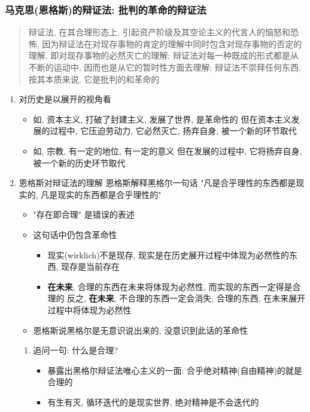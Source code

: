 \documentclass[11pt]{article}
\begin{document}
\subsubsection{马克思(恩格斯)的辩证法: 批判的革命的辩证法}
\label{sec:org94c8fba}
\begin{quote}
辩证法, 在其合理形态上, 引起资产阶级及其空论主义的代言人的恼怒和恐怖, 
因为辩证法在对现存事物的肯定的理解中同时包含对现存事物的否定的理解, 即对现存事物的必然灭亡的理解;
辩证法对每一种既成的形式都是从不断的运动中, 因而也是从它的暂时性方面去理解;
辩证法不崇拜任何东西, 按其本质来说, 它是批判的和革命的
\end{quote}
\begin{enumerate}
\item 对历史是以展开的视角看
\label{sec:orgbf6d819}
\begin{itemize}
\item 如, 资本主义, 打破了封建主义, 发展了世界, 是革命性的
但在资本主义发展的过程中, 它压迫劳动力, 它必然灭亡, 扬弃自身, 被一个新的环节取代
\item 如, 宗教, 有一定的地位, 有一定的意义
但在发展的过程中, 它将扬弃自身, 被一个新的历史环节取代
\end{itemize}
\item 恩格斯对辩证法的理解
\label{sec:orgf6fa2a5}
恩格斯解释黑格尔一句话
"凡是合乎理性的东西都是现实的, 凡是现实的东西都是合乎理性的"
\begin{itemize}
\item "存在即合理" 是错误的表述
\item 这句话中仍包含革命性
\begin{itemize}
\item 现实(wirklich)不是现存, 现实是在历史展开过程中体现为必然性的东西, 现存是当前存在
\item \textbf{在未来}, 合理的东西在未来将体现为必然性, 而实现的东西一定得是合理的
反之, \textbf{在未来}, 不合理的东西一定会消失, 合理的东西, 在未来展开过程中将体现为必然性
\end{itemize}
\item 恩格斯说黑格尔是无意识说出来的, 没意识到此话的革命性
\end{itemize}
\begin{enumerate}
\item 追问一句: 什么是合理?
\label{sec:orgaf981b0}
\begin{itemize}
\item 暴露出黑格尔辩证法唯心主义的一面: 合乎绝对精神(自由精神)的就是合理的
\item 有生有灭, 循环迭代的是现实世界, 绝对精神是不会迭代的

\end{itemize}
\end{enumerate}
\end{enumerate}
\end{document}
